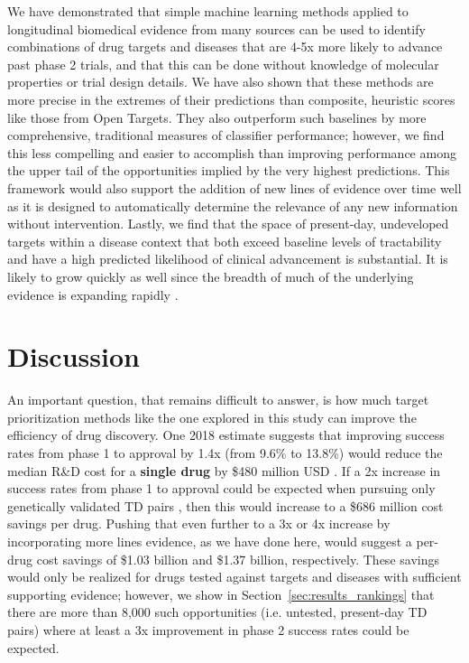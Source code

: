 \documentclass{article}
\begin{document}
We have demonstrated that simple machine learning methods applied to longitudinal biomedical evidence from many sources can be used to identify combinations of drug targets and diseases that are 4-5x more likely to advance past phase 2 trials, and that this can be done without knowledge of molecular properties or trial design details. We have also shown that these methods are more precise in the extremes of their predictions than composite, heuristic scores like those from Open Targets. They also outperform such baselines by more comprehensive, traditional measures of classifier performance; however, we find this less compelling and easier to accomplish than improving performance among the upper tail of the opportunities implied by the very highest predictions. This framework would also support the addition of new lines of evidence over time well as it is designed to automatically determine the relevance of any new information without intervention. Lastly, we find that the space of present-day, undeveloped targets within a disease context that both exceed baseline levels of tractability and have a high predicted likelihood of clinical advancement is substantial. It is likely to grow quickly as well since the breadth of much of the underlying evidence is expanding rapidly \cite{PMID:33214558,PMID:36634672,PMID:31491408}.

\section{Discussion}
\label{sec:discussion}

An important question, that remains difficult to answer, is how much target prioritization methods like the one explored in this study can improve the efficiency of drug discovery. One 2018 estimate suggests that improving success rates from phase 1 to approval by 1.4x (from 9.6\% to 13.8\%) would reduce the median R\&D cost for a \textbf{single drug} by \$480 million USD \cite{PMID:32125404}. If a 2x increase in success rates from phase 1 to approval could be expected when pursuing only genetically validated TD pairs \cite{Nelson2015-eg}, then this would increase to a \$686 million cost savings per drug. Pushing that even further to a 3x or 4x increase by incorporating more lines evidence, as we have done here, would suggest a per-drug cost savings of \$1.03 billion and \$1.37 billion, respectively. These savings would only be realized for drugs tested against targets and diseases with sufficient supporting evidence; however, we show in Section~\ref{sec:results_rankings} that there are more than 8,000 such opportunities (i.e. untested, present-day TD pairs) where at least a 3x improvement in phase 2 success rates could be expected.
\end{document}
